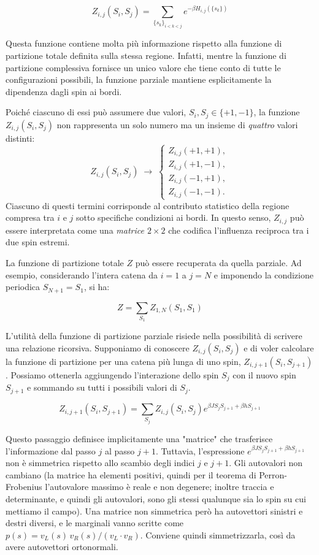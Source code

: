 \begin{equation}
Z_{i,j}(S_i, S_j) = \sum_{\{s_k\}_{i<k<j}} e^{-\beta H_{i,j}(\{s_k\})}
\end{equation}

Questa funzione contiene molta più informazione rispetto alla funzione di partizione totale definita sulla stessa regione. Infatti, mentre la funzione di partizione complessiva fornisce un unico valore che tiene conto di tutte le configurazioni possibili, la funzione parziale mantiene esplicitamente la dipendenza dagli spin ai bordi. 

Poiché ciascuno di essi può assumere due valori, $S_i, S_j \in \{+1, -1\}$, la funzione $Z_{i,j}(S_i, S_j)$ non rappresenta un solo numero ma un insieme di \emph{quattro} valori distinti:
\[
Z_{i,j}(S_i, S_j) \;\longrightarrow\; 
\begin{cases}
Z_{i,j}(+1, +1), \\
Z_{i,j}(+1, -1), \\
Z_{i,j}(-1, +1), \\
Z_{i,j}(-1, -1).
\end{cases}
\]
Ciascuno di questi termini corrisponde al contributo statistico della regione compresa tra $i$ e $j$ sotto specifiche condizioni ai bordi. In questo senso, $Z_{i,j}$ può essere interpretata come una \emph{matrice $2\times2$} che codifica l'influenza reciproca tra i due spin estremi.

La funzione di partizione totale $Z$ può essere recuperata da quella parziale. Ad esempio, considerando l'intera catena da $i=1$ a $j=N$ e imponendo la condizione periodica $S_{N+1} = S_1$, si ha:

\begin{equation}
Z = \sum_{S_1} Z_{1,N}(S_1, S_1)
\end{equation}


L'utilità della funzione di partizione parziale risiede nella possibilità di scrivere una relazione ricorsiva. Supponiamo di conoscere $Z_{i,j}(S_i, S_j)$ e di voler calcolare la funzione di partizione per una catena più lunga di uno spin, $Z_{i,j+1}(S_i, S_{j+1})$. Possiamo ottenerla aggiungendo l'interazione dello spin $S_j$ con il nuovo spin $S_{j+1}$ e sommando su tutti i possibili valori di $S_j$.

\begin{equation}
Z_{i,j+1}(S_i, S_{j+1}) = \sum_{S_j} Z_{i,j}(S_i, S_j) e^{\beta J S_j S_{j+1} + \beta h S_{j+1}}
\end{equation}

Questo passaggio definisce implicitamente una "matrice" che trasferisce l'informazione dal passo $j$ al passo $j+1$. Tuttavia, l'espressione $e^{\beta J S_j S_{j+1} + \beta h S_{j+1}}$ non è simmetrica rispetto allo scambio degli indici $j$ e $j+1$. Gli autovalori non cambiano (la matrice ha elementi positivi, quindi per il teorema di Perron-Frobenius l'autovalore massimo è reale e non degenere; inoltre traccia e determinante, e quindi gli autovalori, sono gli stessi qualunque sia lo spin su cui mettiamo il campo). Una matrice non simmetrica però ha autovettori sinistri e destri diversi, e le marginali vanno scritte come $p(s) = v_L(s)\,v_R(s)/(v_L \cdot v_R)$. Conviene quindi simmetrizzarla, così da avere autovettori ortonormali.

